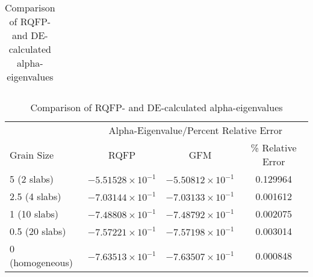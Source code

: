 \begin{table}[!htbp]
\begin{subtable}[h]{1.0\textwidth}
\begin{tabular}{@{}lccc@{}}
	\bottomrule
	\end{tabular}
	\caption{Comparison of RQFP- and GFM-calculated alpha-eigenvalues}
	\label{AlphaGFM}
	\end{subtable}%
	\vspace{0.25cm}
	\begin{subtable}[h]{1.0\textwidth}
	\centering{}
	\begin{tabular}{@{}lccc@{}}\toprule
	& \multicolumn{3}{c}{Alpha-Eigenvalue/Percent Relative Error} \\
	\cmidrule{2-4} Grain Size & RQFP & GFM & \% Relative Error \\
	\midrule
	5 (2 slabs) & $-5.51528 \times 10^{-1}$ & $-5.50812 \times 10^{-1}$ & 0.129964 \\ 
	2.5 (4 slabs) & $-7.03144 \times 10^{-1}$ & $-7.03133 \times 10^{-1}$ & 0.001612 \\ 
	1 (10 slabs) & $-7.48808 \times 10^{-1}$ & $-7.48792 \times 10^{-1}$ & 0.002075 \\ 
	0.5 (20 slabs) & $-7.57221 \times 10^{-1}$ & $-7.57198 \times 10^{-1}$ & 0.003014 \\ 
	0 (homogeneous) & $-7.63513 \times 10^{-1}$ & $-7.63507 \times 10^{-1}$ & 0.000848 \\ 
	\bottomrule
	\end{tabular}
	\caption{Comparison of RQFP- and DE-calculated alpha-eigenvalues}
	\label{AlphaDE}
	\end{subtable}
\end{table}

